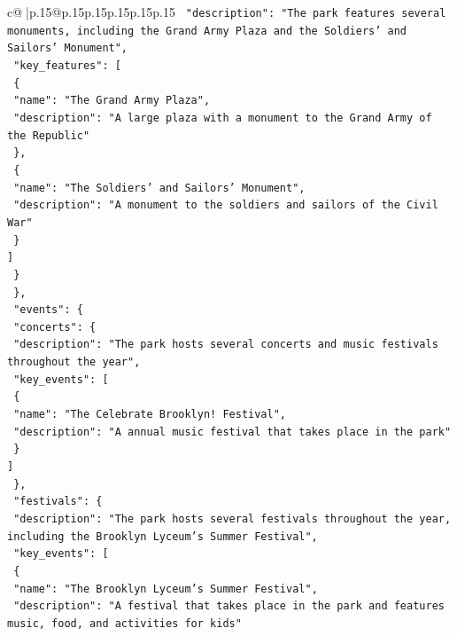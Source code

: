 \documentclass{article}
\begin{document}
{\begin{supertabular}{c@{$\;$}|p{.15\linewidth}@{}p{.15\linewidth}p{.15\linewidth}p{.15\linewidth}p{.15\linewidth}p{.15\linewidth}}
{{{\texttt{      "description": "The park features several monuments, including the Grand Army Plaza and the Soldiers' and Sailors' Monument",} \\
\texttt{      "key\_features": {[}} \\
\texttt{        \{} \\
\texttt{          "name": "The Grand Army Plaza",} \\
\texttt{          "description": "A large plaza with a monument to the Grand Army of the Republic"} \\
\texttt{        \},} \\
\texttt{        \{} \\
\texttt{          "name": "The Soldiers' and Sailors' Monument",} \\
\texttt{          "description": "A monument to the soldiers and sailors of the Civil War"} \\
\texttt{        \}} \\
\texttt{      {]}} \\
\texttt{    \}} \\
\texttt{  \},} \\
\texttt{  "events": \{} \\
\texttt{    "concerts": \{} \\
\texttt{      "description": "The park hosts several concerts and music festivals throughout the year",} \\
\texttt{      "key\_events": {[}} \\
\texttt{        \{} \\
\texttt{          "name": "The Celebrate Brooklyn! Festival",} \\
\texttt{          "description": "A annual music festival that takes place in the park"} \\
\texttt{        \}} \\
\texttt{      {]}} \\
\texttt{    \},} \\
\texttt{    "festivals": \{} \\
\texttt{      "description": "The park hosts several festivals throughout the year, including the Brooklyn Lyceum's Summer Festival",} \\
\texttt{      "key\_events": {[}} \\
\texttt{        \{} \\
\texttt{          "name": "The Brooklyn Lyceum's Summer Festival",} \\
\texttt{          "description": "A festival that takes place in the park and features music, food, and activities for kids"} \\
}}}
\end{supertabular}}
\end{document}
